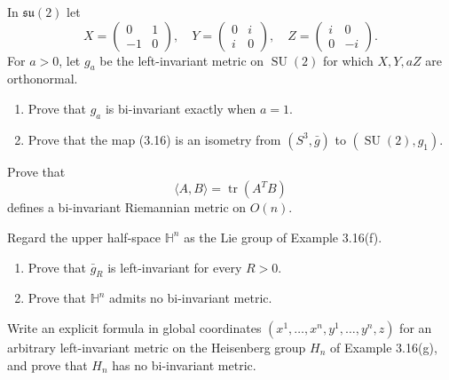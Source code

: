 \begin{exercise}
\label{prob:berger-sphere}
In $\mathfrak{su}(2)$ let
\[
X=\begin{pmatrix}0&1\\-1&0\end{pmatrix},\quad
Y=\begin{pmatrix}0&i\\i&0\end{pmatrix},\quad
Z=\begin{pmatrix}i&0\\0&-i\end{pmatrix}.
\]
For $a>0$, let $g_a$ be the left-invariant metric on $\operatorname{SU}(2)$ for
which $X,Y,aZ$ are orthonormal.
\begin{enumerate}
\item[(a)] Prove that $g_a$ is bi-invariant exactly when $a=1$.
\item[(b)] Prove that the map (3.16) is an isometry from
$(S^3,\bar g)$ to $(\operatorname{SU}(2),g_1)$.
\end{enumerate}
\end{exercise}

\begin{exercise}
\label{prob:orthogonal-group-bi-invariant-metric}
Prove that
\[
\langle A,B\rangle=\operatorname{tr}(A^TB)
\]
defines a bi-invariant Riemannian metric on $O(n)$.
\end{exercise}

\begin{exercise}
\label{prob:hyperbolic-space-metrics}
Regard the upper half-space $\mathbb H^n$ as the Lie group of Example 3.16(f).
\begin{enumerate}
\item[(a)] Prove that $\bar g_R$ is left-invariant for every $R>0$.
\item[(b)] Prove that $\mathbb H^n$ admits no bi-invariant metric.
\end{enumerate}
\end{exercise}

\begin{exercise}
\label{prob:heisenberg-group-metrics}
Write an explicit formula in global coordinates
$(x^1,\ldots,x^n,y^1,\ldots,y^n,z)$ for an arbitrary left-invariant metric on
the Heisenberg group $H_n$ of Example 3.16(g), and prove that $H_n$ has no
bi-invariant metric.
\end{exercise}

